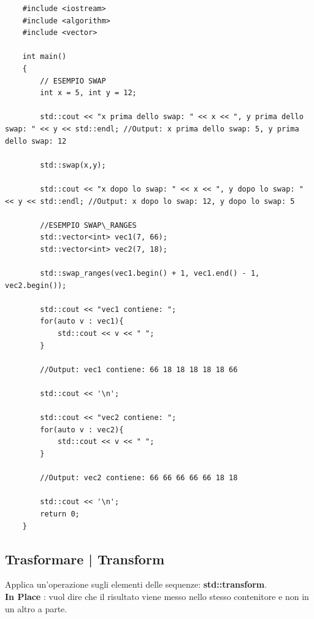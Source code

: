\begin{lstlisting}
	#include <iostream>
	#include <algorithm>
	#include <vector>
	
	int main()
	{
		// ESEMPIO SWAP
		int x = 5, int y = 12;
		
		std::cout << "x prima dello swap: " << x << ", y prima dello swap: " << y << std::endl; //Output: x prima dello swap: 5, y prima dello swap: 12
		
		std::swap(x,y);
		
		std::cout << "x dopo lo swap: " << x << ", y dopo lo swap: " << y << std::endl; //Output: x dopo lo swap: 12, y dopo lo swap: 5
		
		//ESEMPIO SWAP\_RANGES
		std::vector<int> vec1(7, 66);
		std::vector<int> vec2(7, 18);
		
		std::swap_ranges(vec1.begin() + 1, vec1.end() - 1, vec2.begin());
		
		std::cout << "vec1 contiene: ";
		for(auto v : vec1){
			std::cout << v << " ";
		}
	
		//Output: vec1 contiene: 66 18 18 18 18 18 66
		
		std::cout << '\n';
		
		std::cout << "vec2 contiene: ";
		for(auto v : vec2){
			std::cout << v << " ";
		}
	
		//Output: vec2 contiene: 66 66 66 66 66 18 18
		
		std::cout << '\n';
		return 0;
	}
\end{lstlisting}

\subsection{Trasformare | Transform}

\textsf{\small Applica un'operazione sugli elementi delle sequenze: \textbf{std::transform}.} \\

\textsf{\small \textbf{In Place} : vuol dire che il risultato viene messo nello stesso contenitore e non in un altro a parte.} \\

